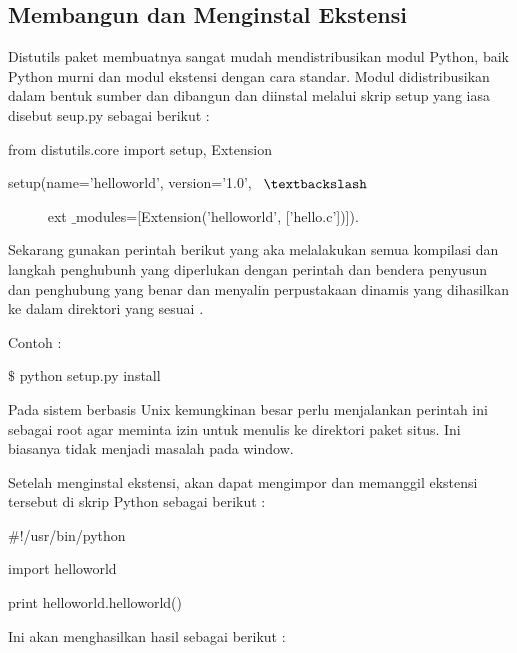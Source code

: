\documentclass{wileySix}
\begin{document}
\begin{myEnumerate}
{\begin{myEnumerate}
\section{Membangun dan Menginstal Ekstensi}
\par
\vspace{12pt}
\vspace{12pt}
\noindent 
\hspace*{0.5in} Distutils paket membuatnya sangat mudah mendistribusikan modul Python, baik Python murni dan modul ekstensi dengan cara standar. Modul didistribusikan dalam bentuk sumber dan dibangun dan diinstal melalui skrip setup yang iasa disebut seup.py sebagai berikut : \par
\noindent 
from distutils.core import setup, Extension \par
\noindent 
setup(name='helloworld', version='1.0',~  $  \textbackslash  $ \par
\noindent 
~~~~~ ext $  \_  $modules=[Extension('helloworld', ['hello.c'])]). \par
\vspace{12pt}
\noindent 
\hspace*{0.5in} Sekarang gunakan perintah berikut yang aka melalakukan semua kompilasi dan langkah penghubunh yang diperlukan dengan perintah dan bendera penyusun dan penghubung yang benar dan menyalin perpustakaan dinamis yang dihasilkan ke dalam direktori yang sesuai . \par
\vspace{12pt}
\noindent 
Contoh : \par
\noindent 
$  \$  $ python setup.py install \par
\vspace{12pt}
\noindent 
\hspace*{0.5in} Pada sistem berbasis Unix kemungkinan besar perlu menjalankan perintah ini sebagai root agar meminta izin untuk menulis ke direktori paket situs. Ini biasanya tidak menjadi masalah pada window. \par
Setelah menginstal ekstensi, akan dapat mengimpor dan memanggil ekstensi tersebut di skrip Python  sebagai berikut : \par
\noindent 
$  \#  $!/usr/bin/python \par
\noindent 
import helloworld \par
\vspace{12pt}
\noindent 
print helloworld.helloworld() \par
\vspace{14pt}
\noindent 
Ini akan menghasilkan hasil sebagai berikut  : \par

\end{myEnumerate}}
\end{myEnumerate}
\end{document}
